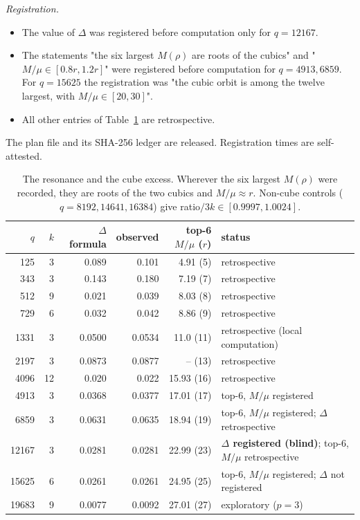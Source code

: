 \documentclass[11pt]{article}
\begin{document}
\emph{Registration.}
\begin{itemize}
\item The value of $\Delta$ was registered before computation only for $q=12167$.
\item The statements "the six largest $M(\rho)$ are roots of the cubics" and "$M/\mu\in[0.8r,1.2r]$" were registered before computation for $q=4913,6859$. For $q=15625$ the registration was "the cubic orbit is among the twelve largest, with $M/\mu\in[20,30]$".
\item All other entries of Table~\ref{tab:res} are retrospective.
\end{itemize}
The plan file and its SHA-256 ledger are released. Registration times are self-attested.
\begin{table}[h]\centering\small
\begin{tabular}{rrrrrl}\toprule $q$&$k$&$\Delta$ formula&observed&top-6 $M/\mu$ ($r$)&status\\ \midrule
125&3&0.089&0.101&4.91 (5)&retrospective\\
343&3&0.143&0.180&7.19 (7)&retrospective\\
512&9&0.021&0.039&8.03 (8)&retrospective\\
729&6&0.032&0.042&8.86 (9)&retrospective\\
1331&3&0.0500&0.0534&11.0 (11)&retrospective (local computation)\\
2197&3&0.0873&0.0877&-- (13)&retrospective\\
4096&12&0.020&0.022&15.93 (16)&retrospective\\
4913&3&0.0368&0.0377&17.01 (17)&top-6, $M/\mu$ registered\\
6859&3&0.0631&0.0635&18.94 (19)&top-6, $M/\mu$ registered; $\Delta$ retrospective\\
12167&3&0.0281&0.0281&22.99 (23)&\textbf{$\Delta$ registered (blind)}; top-6, $M/\mu$ retrospective\\
15625&6&0.0261&0.0261&24.95 (25)&top-6, $M/\mu$ registered; $\Delta$ not registered\\
19683&9&0.0077&0.0092&27.01 (27)&exploratory ($p=3$)\\
\bottomrule\end{tabular}
\caption{The resonance and the cube excess. Wherever the six largest $M(\rho)$ were recorded, they are roots of the two cubics and $M/\mu\approx r$.
Non-cube controls ($q=8192,14641,16384$) give ratio$/3k\in[0.9997,1.0024]$.}\label{tab:res}\end{table}
\end{document}
